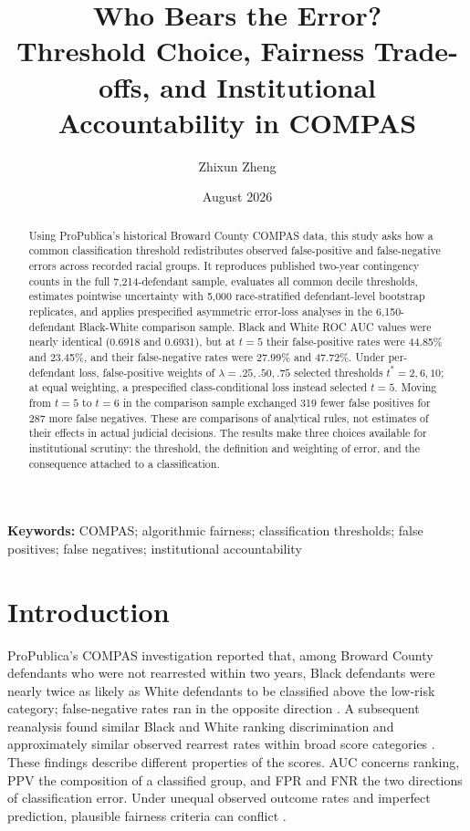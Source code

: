 \documentclass[11pt,letterpaper]{article}
\title{\textbf{Who Bears the Error?}\\[5pt]
\large Threshold Choice, Fairness Trade-offs, and Institutional Accountability in COMPAS}
\author{Zhixun Zheng}
\date{August 2026}
\begin{document}
\maketitle

\begin{abstract}
Using ProPublica's historical Broward County COMPAS data, this study asks how a common classification threshold redistributes observed false-positive and false-negative errors across recorded racial groups. It reproduces published two-year contingency counts in the full 7,214-defendant sample, evaluates all common decile thresholds, estimates pointwise uncertainty with 5,000 race-stratified defendant-level bootstrap replicates, and applies prespecified asymmetric error-loss analyses in the 6,150-defendant Black-White comparison sample. Black and White ROC AUC values were nearly identical (0.6918 and 0.6931), but at $t=5$ their false-positive rates were 44.85\% and 23.45\%, and their false-negative rates were 27.99\% and 47.72\%. Under per-defendant loss, false-positive weights of $\lambda=.25,.50,.75$ selected thresholds $t^*=2,6,10$; at equal weighting, a prespecified class-conditional loss instead selected $t=5$. Moving from $t=5$ to $t=6$ in the comparison sample exchanged 319 fewer false positives for 287 more false negatives. These are comparisons of analytical rules, not estimates of their effects in actual judicial decisions. The results make three choices available for institutional scrutiny: the threshold, the definition and weighting of error, and the consequence attached to a classification.
\end{abstract}

\noindent\textbf{Keywords:} COMPAS; algorithmic fairness; classification thresholds; false positives; false negatives; institutional accountability

\section{Introduction}

ProPublica's COMPAS investigation reported that, among Broward County defendants who were not rearrested within two years, Black defendants were nearly twice as likely as White defendants to be classified above the low-risk category; false-negative rates ran in the opposite direction \citep{angwin2016,larson2016}. A subsequent reanalysis found similar Black and White ranking discrimination and approximately similar observed rearrest rates within broad score categories \citep{flores2016}. These findings describe different properties of the scores. AUC concerns ranking, PPV the composition of a classified group, and FPR and FNR the two directions of classification error. Under unequal observed outcome rates and imperfect prediction, plausible fairness criteria can conflict \citep{chouldechova2017,kleinberg2017}.
\end{document}
